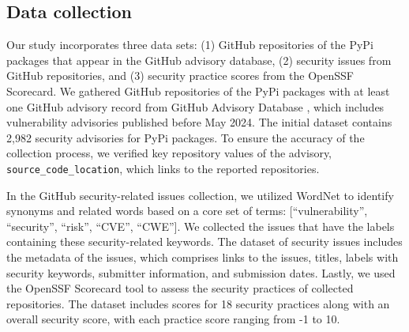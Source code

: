 \subsection{Data collection}
Our study incorporates three data sets: (1) GitHub repositories of the PyPi packages that appear in the GitHub advisory database, (2) security issues from GitHub repositories, and (3) security practice scores from the OpenSSF Scorecard. We gathered GitHub repositories of the PyPi packages with at least one GitHub advisory record from GitHub Advisory Database \cite{GitHubAdvisoryDatabase:online}, which includes vulnerability advisories published before May 2024. The initial dataset contains 2,982 security advisories for PyPi packages. To ensure the accuracy of the collection process, we verified key repository values of the advisory, \texttt{source\_code\_location}, which links to the reported repositories.






In the GitHub security-related issues collection, we utilized WordNet \cite{WordNetDoc:online} to identify synonyms and related words based on a core set of terms: [``vulnerability'', ``security'', ``risk'', ``CVE'', ``CWE'']. We collected the issues that have the labels containing these security-related keywords. The dataset of security issues includes the metadata of the issues, which comprises links to the issues, titles, labels with security keywords, submitter information, and submission dates. Lastly, we used the OpenSSF Scorecard tool to assess the security practices of collected repositories. The dataset includes scores for 18 security practices along with an overall security score, with each practice score ranging from -1 to 10.

